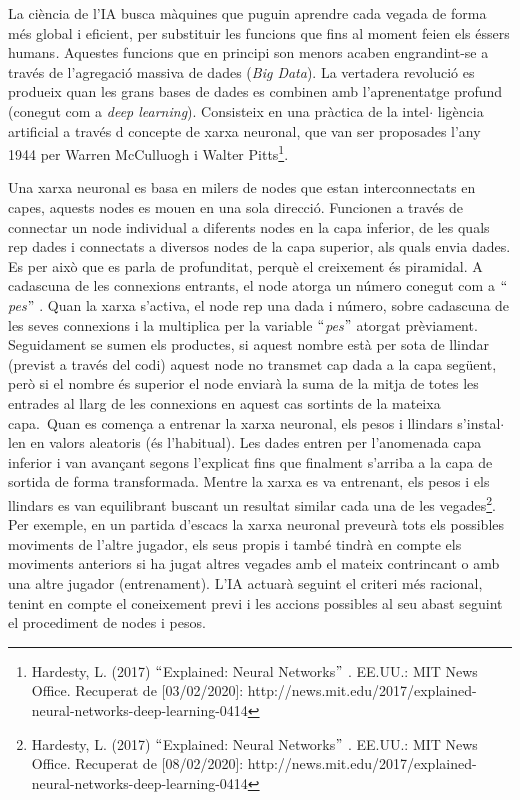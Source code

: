 \documentclass[12pt]{article}
\renewcommand{\_}{\kern-1.5pt\textunderscore\kern-1.5pt}
\begin{document}
\begin{itemize}
\vspace{\baselineskip}
\begin{justify}
La ciència de l’IA busca màquines que puguin aprendre cada vegada de forma més global i eficient, per substituir les funcions que fins al moment feien els éssers humans\textit{.} Aquestes funcions que en principi son menors acaben engrandint-se a través de l’agregació massiva de dades (\textit{Big Data}).  La vertadera revolució es produeix quan les grans bases de dades es combinen amb l’aprenentatge profund (conegut com a \textit{deep learning}). Consisteix en una pràctica de la intel$ \cdot $ ligència artificial a través d concepte de xarxa neuronal, que van ser proposades l’any 1944 per Warren McCulluogh i Walter Pitts\footnote{ Hardesty, L. (2017) $``$Explained: Neural Networks$"$ . EE.UU.: MIT News Office. Recuperat de [03/02/2020]: http://news.mit.edu/2017/explained-neural-networks-deep-learning-0414 }. 
\end{justify}\par


\vspace{\baselineskip}
\begin{justify}
Una xarxa neuronal es basa en milers de nodes que estan interconnectats en capes, aquests nodes es mouen en una sola direcció. Funcionen a través de connectar un node individual a diferents nodes en la capa inferior, de les quals rep dades i connectats a diversos nodes de la capa superior, als quals envia dades. Es per això que es parla de profunditat, perquè el creixement és piramidal. A cadascuna de les connexions entrants, el node atorga un número conegut com a $``$\textit{pes}$"$ . Quan la xarxa s’activa, el node rep una dada i número, sobre cadascuna de les seves connexions i la multiplica per la variable $``$\textit{pes}$"$  atorgat prèviament. Seguidament se sumen els productes, si aquest nombre està per sota de llindar (previst a través del codi) aquest node no transmet cap dada a la capa següent, però si el nombre és superior el node enviarà la suma de la mitja de totes les entrades al llarg de les connexions en aquest cas sortints de la mateixa capa.\  Quan es comença a entrenar la xarxa neuronal, els pesos i llindars s’instal$ \cdot $ len en valors aleatoris (és l’habitual). Les dades entren per l’anomenada capa inferior i van avançant segons l’explicat fins que finalment s’arriba a la capa de sortida de forma transformada. Mentre la xarxa es va entrenant, els pesos i els llindars es van equilibrant buscant un resultat similar cada una de les vegades\footnote{ Hardesty, L. (2017) $``$Explained: Neural Networks$"$ . EE.UU.: MIT News Office. Recuperat de [08/02/2020]: http://news.mit.edu/2017/explained-neural-networks-deep-learning-0414 }.  Per exemple, en un partida d’escacs la xarxa neuronal preveurà tots els possibles moviments de l’altre jugador, els seus propis i també tindrà en compte els moviments anteriors si ha jugat altres vegades amb el mateix contrincant o amb una altre jugador (entrenament). L’IA actuarà seguint el criteri més racional, tenint en compte el coneixement previ i les accions possibles al seu abast seguint el procediment de nodes i pesos. 
\end{justify}\par



\end{itemize}
\end{document}
